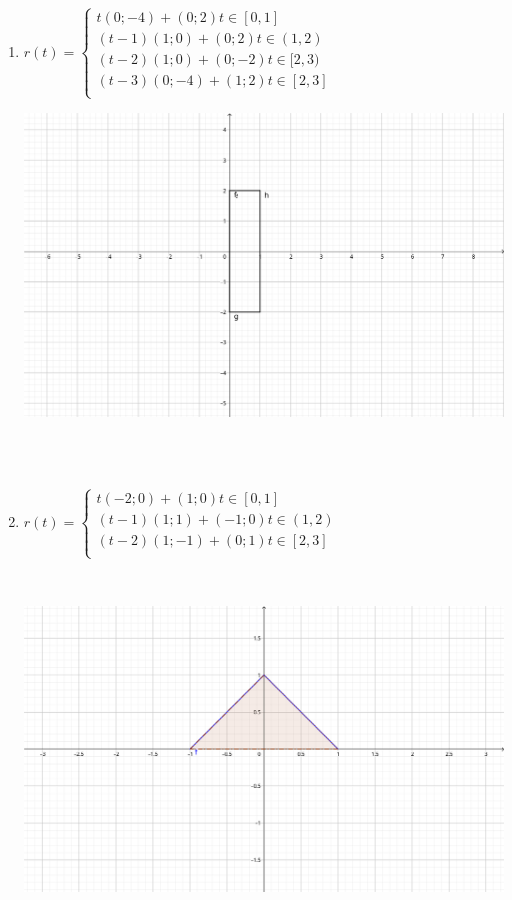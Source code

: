 \documentclass[../practica_02.tex]{subfiles}
\begin{document}
    \begin{enumerate}
        \item
            \quad $ r(t) = \left\{
                \begin{array}{ll}
                    t(0; -4) + (0; 2) t \in [0,1]\\
                    (t-1)(1; 0) + (0; 2) t \in (1,2)\\
                    (t-2)(1; 0) + (0; -2) t \in [2,3)\\
                    (t-3)(0; -4) + (1; 2) t \in [2,3]\\
                \end{array}
                \right.$

            \includegraphics[scale=0.8]{ej11/resources/a.png} $ $

            $ $

        \item 
            \quad $ r(t) = \left\{
                \begin{array}{ll}
                    t(-2; 0) + (1; 0) t \in [0,1]\\
                    (t-1)(1; 1) + (-1; 0) t \in (1,2)\\
                    (t-2)(1; -1) + (0; 1) t \in [2,3]\\
                \end{array}
                \right.$

            $ $

            \includegraphics[scale=1]{ej11/resources/b.png} $ $

    \end{enumerate}
\end{document}
